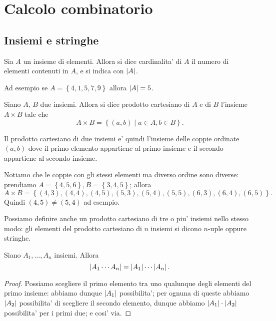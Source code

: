 \chapter{Calcolo combinatorio}

\section{Insiemi e stringhe}

\begin{definition}
    Sia $A$ un insieme di elementi. Allora si dice cardinalita' di $A$ il numero di elementi contenuti in $A$, e si indica con $\left|A\right|$.
\end{definition}
Ad esempio se $A = \left\{ 4, 1, 5, 7, 9\right\}$ allora $\left|A\right| = 5$.

\begin{definition}
    Siano $A$, $B$ due insiemi. Allora si dice prodotto cartesiano di $A$ e di $B$ l'insieme $A \times B$ tale che \[
        A \times B = \left\{ (a, b) \mid a \in A, b \in B\right\}   
    .\]
\end{definition}
Il prodotto cartesiano di due insiemi e' quindi l'insieme delle coppie ordinate $(a, b)$ dove il primo elemento appartiene al primo insieme e il secondo appartiene al secondo insieme. 

Notiamo che le coppie con gli stessi elementi ma diverso ordine sono diverse: prendiamo $A = \left\{ 4, 5, 6 \right\}, B = \left\{ 3, 4, 5 \right\}$; allora \[
    A \times B = \left\{ (4, 3), (4, 4), (4, 5), (5, 3), (5, 4), (5, 5), (6, 3), (6, 4), (6, 5)\right\}   
.\] Quindi $(4, 5) \neq (5, 4)$ ad esempio.

Possiamo definire anche un prodotto cartesiano di tre o piu' insiemi nello stesso modo: gli elementi del prodotto cartesiano di $n$ insiemi si dicono $n$-uple oppure stringhe.

\begin{proposition}\label{cardinalita_prodotto_cartesiano}
    Siano $A_1, \dots, A_n$ insiemi. Allora \begin{equation}
        \left|A_1 \cdots A_n\right| = \left|A_1\right| \cdots \left|A_n\right|.
    \end{equation}
\end{proposition}
\begin{proof}
    Possiamo scegliere il primo elemento tra uno qualunque degli elementi del primo insieme: abbiamo dunque $\left|A_1\right|$ possibilita'; per ognuna di queste abbiamo $\left|A_2\right|$ possibilita' di scegliere il secondo elemento, dunque abbiamo $\left|A_1\right| \cdot \left|A_2\right|$ possibilita' per i primi due; e cosi' via.
\end{proof}

